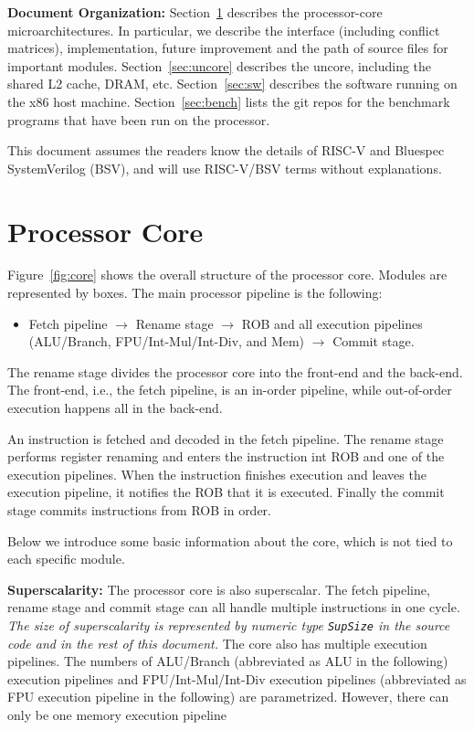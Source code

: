 \documentclass[12pt]{article}
\newcommand{\code}[1]{\texttt{#1}}
\begin{document}
\noindent\textbf{Document Organization:}
Section~\ref{sec:core} describes the processor-core microarchitectures.
In particular, we describe the interface (including conflict matrices), implementation, future improvement and the path of source files for important modules.
Section~\ref{sec:uncore} describes the uncore, including the shared L2 cache, DRAM, etc.
Section~\ref{sec:sw} describes the software running on the x86 host machine.
Section~\ref{sec:bench} lists the git repos for the benchmark programs that have been run on the processor.

This document assumes the readers know the details of RISC-V and Bluespec SystemVerilog (BSV), and will use RISC-V/BSV terms without explanations.

\section{Processor Core}\label{sec:core}

Figure~\ref{fig:core} shows the overall structure of the processor core.
Modules are represented by boxes.
The main processor pipeline is the following:
\begin{itemize}
    \item Fetch pipeline $\rightarrow$ Rename stage $\rightarrow$ ROB and all execution pipelines (ALU/Branch, FPU/Int-Mul/Int-Div, and Mem) $\rightarrow$ Commit stage.
\end{itemize}
The rename stage divides the processor core into the front-end and the back-end.
The front-end, i.e., the fetch pipeline, is an in-order pipeline, while out-of-order execution happens all in the back-end.

An instruction is fetched and decoded in the fetch pipeline.
The rename stage performs register renaming and enters the instruction int ROB and one of the execution pipelines.
When the instruction finishes execution and leaves the execution pipeline, it notifies the ROB that it is executed.
Finally the commit stage commits instructions from ROB in order.

Below we introduce some basic information about the core, which is not tied to each specific module.

\noindent\textbf{Superscalarity:}
The processor core is also superscalar.
The fetch pipeline, rename stage and commit stage can all handle multiple instructions in one cycle.
\emph{The size of superscalarity is represented by numeric type \code{SupSize} in the source code and in the rest of this document.}
The core also has multiple execution pipelines.
The numbers of ALU/Branch (abbreviated as ALU in the following) execution pipelines and FPU/Int-Mul/Int-Div execution pipelines (abbreviated as FPU execution pipeline in the following) are parametrized.
However, there can only be one memory execution pipeline
\end{document}
